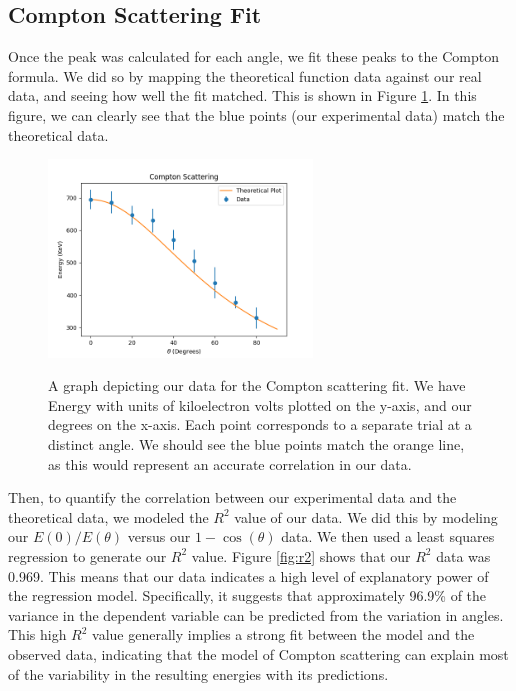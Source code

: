 \documentclass[10pt,letterpaper,onecolumn]{article}
\begin{document}
\subsection{Compton Scattering Fit}
Once the peak was calculated for each angle, we fit these peaks to the Compton formula. We did so by mapping the theoretical function data against our real data, and seeing how well the fit matched. This is shown in Figure \ref{fig:comfit}. In this figure, we can clearly see that the blue points (our experimental data) match the theoretical data. 

\begin{figure}[hbt!]
    \begin{center}
        {{\includegraphics[width=7cm]{ScatteringFit.png} }}%
        \caption{A graph depicting our data for the Compton scattering fit. We have Energy with units of kiloelectron volts plotted on the y-axis, and our degrees on the x-axis. Each point corresponds to a separate trial at a distinct angle. We should see the blue points match the orange line, as this would represent an accurate correlation in our data.}%
        \label{fig:comfit}%
    \end{center}
\end{figure}

Then, to quantify the correlation between our experimental data and the theoretical data, we modeled the $R^{2}$ value of our data. We did this by modeling our $E(0)/E(\theta)$ versus our $1 - \cos(\theta)$ data. We then used a least squares regression to generate our $R^{2}$ value. Figure \ref{fig:r2} shows that our $R^{2}$ data was 0.969. This means that our data indicates a high level of explanatory power of the regression model. Specifically, it suggests that approximately 96.9\% of the variance in the dependent variable can be predicted from the variation in angles. This high \(R^2\) value generally implies a strong fit between the model and the observed data, indicating that the model of Compton scattering can explain most of the variability in the resulting energies with its predictions.
\end{document}
